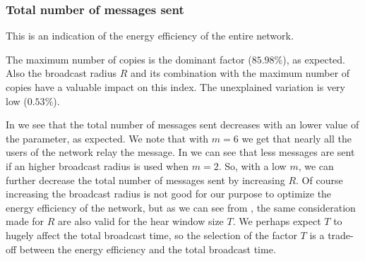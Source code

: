 \subsubsection{Total number of messages sent}\label{subsubsec:hd2krmessages}

This is an indication of the energy efficiency of the entire network.

The maximum number of copies is the dominant factor (\(85.98\%\)), as expected.
Also the broadcast radius \(R\) and its combination with the maximum
number of copies have a valuable impact on this index. The unexplained variation
is very low (\(0.53\%\)).

In  we see that the total number of messages sent
decreases with an lower value of the  parameter, as expected.
We note that with \(m\!=\!6\) we get that nearly all the users of the network
relay the message. In  we can see that less
messages are sent if an higher broadcast radius is used when \(m\!=\!2\). So,
with a low \(m\), we can further decrease the total number of messages sent by
increasing \(R\). Of course increasing the broadcast radius is not good for our
purpose to optimize the energy efficiency of the network, but as we can see from
, the same consideration made for \(R\) are also
valid for the hear window size \(T\). We perhaps expect \(T\) to hugely affect
the total broadcast time, so the selection of the factor \(T\) is a trade-off
between the energy efficiency and the total broadcast time.

